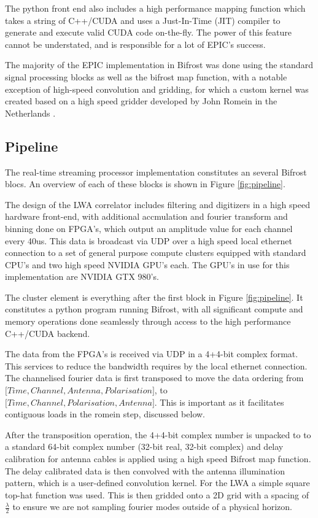 \documentclass[bibliography=totocnumbered, twocolumn]{article}
\begin{document}
The python front end also includes a high performance mapping
function which takes a string of C++/CUDA and uses a Just-In-Time (JIT)
compiler to generate and execute valid CUDA code on-the-fly. The
power of this feature cannot be understated, and is responsible
for a lot of EPIC's success.

The majority of the EPIC implementation in Bifrost was done using the
standard signal processing blocks as well as the bifrost map function,
with a notable exception of high-speed convolution and gridding, for
which a custom kernel was created based on a high speed gridder
developed by John Romein in the Netherlands
\citep{romein_efficient_2012}.

\subsection{Pipeline}

The real-time streaming processor implementation constitutes an
several Bifrost blocs. An overview of each of these blocks is shown
in Figure \ref{fig:pipeline}.

The design of the LWA correlator includes filtering and digitizers in
a high speed hardware front-end, with additional accmulation and
fourier transform and binning done on FPGA's, which output an
amplitude value for each channel every 40us. This data is broadcast
via UDP over a high speed local ethernet connection to a set of
general purpose compute clusters equipped with standard CPU's and two
high speed NVIDIA GPU's each.  The GPU's in use for this
implementation are NVIDIA GTX 980's.

The cluster element is everything after the first block in Figure \ref{fig:pipeline}.
It constitutes a python program running Bifrost, with all significant
compute and memory operations done seamlessly through access to the
high performance C++/CUDA backend.

The data from the FPGA's is received via UDP in a 4+4-bit complex
format.  This services to reduce the bandwidth requires by the local
ethernet connection.  The channelised fourier data is first transposed
to move the data ordering from $\big[Time, Channel, Antenna,
Polarisation\big]$, to $\big[Time, Channel, Polarisation,
Antenna\big]$. This is important as it facilitates contiguous loads in
the romein step, discussed below.

After the transposition operation, the 4+4-bit complex number is
unpacked to to a standard 64-bit complex number (32-bit real, 32-bit complex)
and delay calibration for antenna cables is applied using a high
speed Bifrost map function. The delay calibrated data is then
convolved with the antenna illumination pattern, which is a user-defined
convolution kernel. For the LWA a simple square top-hat function was
used. This is then gridded onto a 2D grid with a spacing of $\frac{\lambda}{2}$
to ensure we are not sampling fourier modes outside of a physical horizon.
\end{document}
